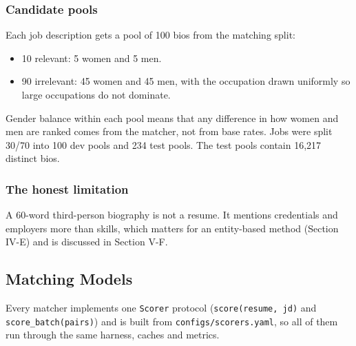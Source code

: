 \documentclass[conference,a4paper]{IEEEtran}
\begin{document}
\subsubsection{Candidate pools} Each job description gets a pool of 100 bios from the matching split:

\begin{itemize}
\item 10 relevant: 5 women and 5 men.
\item 90 irrelevant: 45 women and 45 men, with the occupation drawn uniformly so large occupations do not dominate.
\end{itemize}
Gender balance within each pool means that any difference in how women and men are ranked comes from the matcher, not from base rates. Jobs were split 30/70 into 100 dev pools and 234 test pools. The test pools contain 16,217 distinct bios.

\subsubsection{The honest limitation} A 60-word third-person biography is not a resume. It mentions credentials and employers more than skills, which matters for an entity-based method (Section IV-E) and is discussed in Section V-F.

\subsection{Matching Models}
Every matcher implements one \texttt{Scorer} protocol (\texttt{score(resume, jd)} and \texttt{score\_\allowbreak{}batch(pairs)}) and is built from \texttt{configs/\allowbreak{}scorers.\allowbreak{}yaml}, so all of them run through the same harness, caches and metrics.
\end{document}
